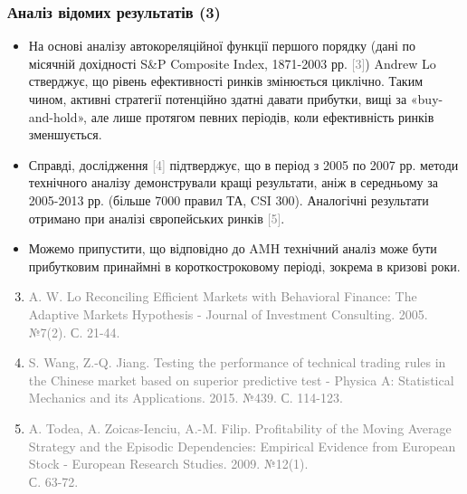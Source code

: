 \documentclass[aspectratio=169]{beamer}
\begin{document}
\begin{frame}
\frametitle{Аналіз відомих результатів (3)}
\begin{itemize}
\item На основі аналізу автокореляційної функції першого порядку (дані по місячній дохідності S&P Composite Index, 1871-2003 рр. \textcolor{gray}{[3]}) Andrew Lo стверджує, що рівень ефективності ринків змінюється циклічно. Таким чином, активні стратегії потенційно здатні давати прибутки, вищі за «buy-and-hold», але лише протягом певних періодів, коли ефективність ринків зменшується. 
\tinyskip
\item Справді, дослідження \textcolor{gray}{[4]} підтверджує, що в період з 2005 по 2007 рр. методи технічного аналізу демонстрували кращі результати, аніж в середньому за 2005-2013 рр. (більше 7000 правил ТА, CSI 300). Аналогічні результати отримано при аналізі європейських ринків \textcolor{gray}{[5]}.
\tinyskip
\item Можемо припустити, що відповідно до AMH технічний аналіз може бути прибутковим принаймні в короткостроковому періоді, зокрема в кризові роки.
\end{itemize}
\tinyskip
\scriptsize 
\begin{enumerate}
\setcounter{enumi}{2}
\scriptsize \item \textcolor{gray}{A. W. Lo Reconciling Efficient Markets with Behavioral Finance: The Adaptive Markets Hypothesis - Journal of Investment Consulting. 2005. №7(2). С. 21-44.} 
\scriptsize \item \textcolor{gray}{S. Wang, Z.-Q. Jiang. Testing the performance of technical trading rules in the Chinese market based on superior predictive test - Physica A: Statistical Mechanics and its Applications. 2015. №439. С. 114-123.}
\scriptsize \item \textcolor{gray}{ A. Todea, A. Zoicas-Ienciu, A.-M. Filip. Profitability of the Moving Average Strategy and the Episodic Dependencies: Empirical Evidence from European Stock - European Research Studies. 2009. №12(1). \\С. 63-72.}
\end{enumerate}
\end{frame}
\end{document}
